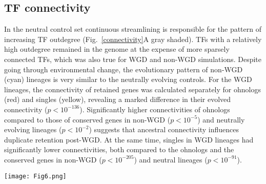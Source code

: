 \subsection{TF connectivity}
In the neutral control set continuous streamlining is responsible for the pattern of increasing TF outdegree (Fig.~\ref{connectivity}A gray shaded). TFs with a relatively high outdegree remained in the genome at the expense of more sparsely connected TFs, which was also true for WGD and non-WGD simulations. Despite going through environmental change, the evolutionary pattern of non-WGD (cyan) lineages is very similar to the neutrally evolving controls. For the WGD lineages, the connectivity of retained genes was calculated separately for ohnologs (red) and singles (yellow), revealing a marked difference in their evolved connectivity ($p<10^{-136}$). Significantly higher connectivities of ohnologs compared to those of conserved genes in non-WGD ($p<10^{-5}$) and neutrally evolving lineages ($p<10^{-2}$) suggests that ancestral connectivity influences duplicate retention post-WGD. At the same time, singles in WGD lineages had significantly lower connectivities, both compared to the ohnologs and the conserved genes in non-WGD ($p<10^{-205}$) and neutral lineages ($p<10^{-91}$). 

\begin{figure*}
\begin{center}
\texttt{[image: Fig6.png]}
\end{center}
\caption{\textbf{Ancestral outdegree and binding site conservation of conserved TFs.} At the time of WGD all TFs were identified and their outdegree and binding site motifs recorded. At 1000 generation intervals conserved TFs from the time of WGD or, if there was no WGD, from the time point when environmental change was applied for the re-adaptation experiments, were identified in the genomes in the line of descent. (A) The average ancestral outdegree of the retained TFs (recorded at the reference time point) was divided by the average outdegree of the all ancestral TFs, thus providing a measure of the influence of ancestral connectivity on the rate of conservation of TFs. For WGD lineages this relative outdegree of conserved TFs was measured separately for ohnologs (red) and singles (yellow). For comparison, the analysis was also done for non-WGD (cyan) lineages and a neutrally evolving control set (gray). (B) The current and ancestral binding sequences of the TFs were compared and conservation score set to 1 if they remained the same and 0 otherwise and all scores averaged per individual.}
\label{connectivity}
\end{figure*}

